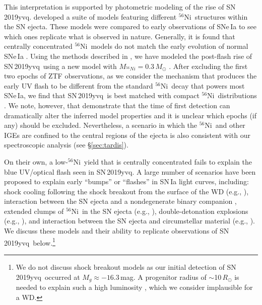 \documentclass[twocolumn]{aastex63}
\newcommand{\radni}{$^{56}$Ni}
\newcommand{\sn}{SN\,2019yvq}
\begin{document}
This interpretation is supported by photometric modeling of the rise of \sn.
\citet{Magee20} developed a suite of models featuring different \radni\
structures within the SN ejecta. These models were compared to early
observations of SNe\,Ia to see which ones replicate what is observed in
nature. Generally, it is found that centrally concentrated \radni\ models do
not match the early evolution of normal SNe\,Ia \citep{Magee20}. Using the
methods described in \citet{Magee20}, we have modeled the post-flash rise of
\sn\ using a new model with $M_{^{56}Ni} = 0.3\,M_\odot$ \citep[the models
in][all have $M_{^{56}Ni} > 0.4\,M_\odot$ and are therefore more luminous than
\sn]{Magee20}. After excluding the first two epochs of ZTF observations, as we
consider the mechanism that produces the early UV flash to be different from
the standard \radni\ decay that powers most SNe\,Ia, we find that \sn\ is best
matched with compact \radni\ distributions \citep[following the convention
of][a \texttt{EXP\_Ni0.3\_KE1.40\_P21} model provides the best match to \sn,
see also Figure~\ref{fig:Ni_bullet}]{Magee20}. We note, however, that
\citet{Magee20} demonstrate that the time of first detection can dramatically
alter the inferred model properties and it is unclear which epochs (if any)
should be excluded. Nevertheless, a scenario in which the \radni\ and other
IGEs are confined to the central regions of the ejecta is also consistent with
our spectroscopic analysis (see \S\ref{sec:tardis}).

On their own, a low-\radni\ yield that is centrally concentrated fails to
explain the blue UV/optical flash seen in \sn. A large number of scenarios
have been proposed to explain early ``bumps'' or ``flashes'' in SN\,Ia light
curves, including: shock cooling following the shock breakout from the surface
of the WD (e.g., \citealt{Piro10,Rabinak11}), interaction between the SN
ejecta and a nondegenerate binary companion \citep{Kasen10a}, extended clumps
of \radni\ in the SN ejecta (e.g., \citealt{Shappee19,Dimitriadis19}),
double-detonation explosions (e.g., \citealt{Noebauer17,Polin19}), and
interaction between the SN ejecta and circumstellar material (e.g.,
\citealt{Dessart14,Piro16,Levanon17}). We discuss these models and their
ability to replicate observations of \sn\ below.\footnote{We do not discuss
shock breakout models as our initial detection of \sn\ occurred at $M_g
\approx -16.3$\,mag. A progenitor radius of $\sim$10$\,R_\odot$ is needed to
explain such a high luminosity \citep{Piro10,Rabinak11}, which we consider
implausible for a WD.}
\end{document}
